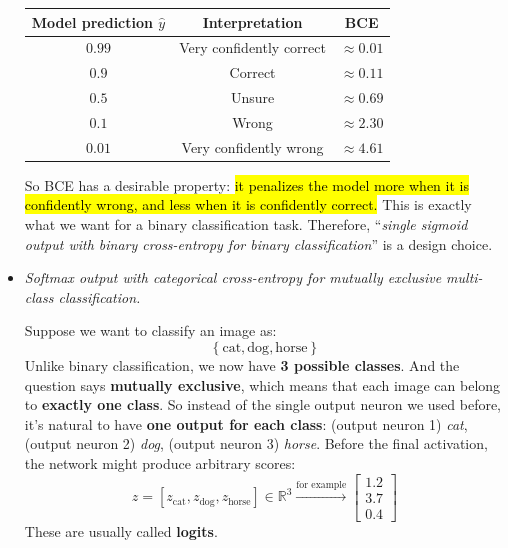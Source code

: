 \begin{itemize}
        \begin{center}
            \begin{tabular}{@{} c c c @{}}
                \toprule
                \textbf{Model prediction $\hat{y}$} & \textbf{Interpretation} & \textbf{BCE} \\
                \midrule
                $0.99$ & Very confidently correct & $\approx 0.01$ \\
                $0.9$  & Correct & $\approx 0.11$ \\
                $0.5$  & Unsure & $\approx 0.69$ \\
                $0.1$  & Wrong & $\approx 2.30$ \\
                $0.01$ & Very confidently wrong & $\approx 4.61$ \\
                \bottomrule
            \end{tabular}
        \end{center}

        So BCE has a desirable property: \hl{it penalizes the model more when it is confidently wrong, and less when it is confidently correct.} This is exactly what we want for a binary classification task. Therefore, ``\emph{single sigmoid output with binary cross-entropy for binary classification}'' is a  design choice.

    \item \emph{Softmax output with categorical cross-entropy for mutually exclusive multi-class classification.}

        Suppose we want to classify an image as:
        \begin{equation*}
            \left\{\text{cat}, \text{dog}, \text{horse}\right\}
        \end{equation*}
        Unlike binary classification, we now have \textbf{3 possible classes}. And the question says \textbf{mutually exclusive}, which means that each image can belong to \textbf{exactly one class}. So instead of the single output neuron we used before, it's natural to have \textbf{one output for each class}: (output neuron 1) \emph{cat}, (output neuron 2) \emph{dog}, (output neuron 3) \emph{horse}. Before the final activation, the network might produce arbitrary scores:
        \begin{equation*}
            z = \left[z_{\text{cat}}, z_{\text{dog}}, z_{\text{horse}}\right] \in \mathbb{R}^{3} \xrightarrow{\text{for example}}
            \begin{bmatrix}
                1.2 \\
                3.7 \\
                0.4
            \end{bmatrix}
        \end{equation*}
        These are usually called \textbf{logits}.


\end{itemize}
